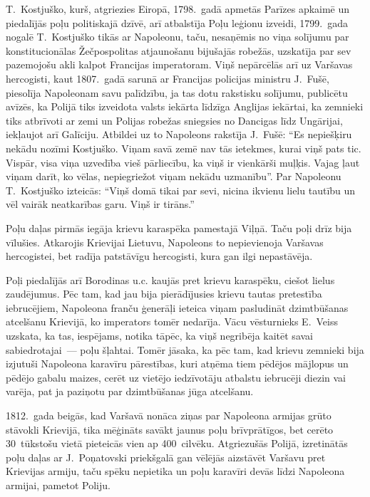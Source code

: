 \documentclass[twoside,a5paper,12pt,fleqn,openany]{extbook}
\begin{document}
T.~Kostjuško, kurš, atgriezies Eiropā, 1798.~gadā apmetās Parīzes apkaimē un piedalījās poļu politiskajā dzīvē, arī atbalstīja Poļu leģionu izveidi, 1799.~gada nogalē T.~Kostjuško tikās ar Napoleonu, taču, nesaņēmis no viņa solījumu par konstitucionālas Žečpospolitas atjaunošanu bijušajās robežās, uzskatīja par sev pazemojošu akli kalpot Francijas imperatoram. Viņš nepārcēlās arī uz Varšavas hercogisti, kaut 1807.~gadā sarunā ar Francijas policijas ministru J.~Fušē, piesolīja Napoleonam savu palīdzību, ja tas dotu rakstisku solījumu, publicētu avīzēs, ka Polijā tiks izveidota valsts iekārta līdzīga Anglijas iekārtai, ka zemnieki tiks atbrīvoti ar zemi un Polijas robežas sniegsies no Dancigas līdz Ungārijai, iekļaujot arī Galīciju. Atbildei uz to Napoleons rakstīja J.~Fušē: ``Es nepiešķiru nekādu nozīmi Kostjuško. Viņam savā zemē nav tās ietekmes, kurai viņš pats tic. Vispār, visa viņa uzvedība vieš pārliecību, ka viņš ir vienkārši muļķis. Vajag ļaut viņam darīt, ko vēlas, nepiegriežot viņam nekādu uzmanību''. Par Napoleonu T.~Kostjuško izteicās: ``Viņš domā tikai par sevi, nicina ikvienu lielu tautību un vēl vairāk neatkarības garu. Viņš ir tirāns.''

Poļu daļas pirmās iegāja krievu karaspēka pamestajā Viļņā. Taču poļi drīz bija vīlušies. Atkarojis Krievijai Lietuvu, Napoleons to nepievienoja Varšavas hercogistei, bet radīja patstāvīgu hercogisti, kura gan ilgi nepastāvēja.

Poļi piedalījās arī Borodinas u.c. kaujās pret krievu karaspēku, ciešot lielus zaudējumus. Pēc tam, kad jau bija pierādījusies krievu tautas pretestība iebrucējiem, Napoleona franču ģenerāļi ieteica viņam pasludināt dzimtbūšanas atcelšanu Krievijā, ko imperators tomēr nedarīja. Vācu vēsturnieks E.~Veiss uzskata, ka tas, iespējams, notika tāpēc, ka viņš negribēja kaitēt savai sabiedrotajai~--- poļu šļahtai. Tomēr jāsaka, ka pēc tam, kad krievu zemnieki bija izjutuši Napoleona karavīru pārestības, kuri atņēma tiem pēdējos mājlopus un pēdējo gabalu maizes, cerēt uz vietējo iedzīvotāju atbalstu iebrucēji diezin vai varēja, pat ja paziņotu par dzimtbūšanas jūga atcelšanu.

1812.~gada beigās, kad Varšavā nonāca ziņas par Napoleona armijas grūto stāvokli Krievijā, tika mēģināts savākt jaunus poļu brīvprātīgos, bet cerēto 30~tūkstošu vietā pieteicās vien ap 400~cilvēku. Atgriezušās Polijā, izretinātās poļu daļas ar J.~Poņatovski priekšgalā gan vēlējās aizstāvēt Varšavu pret Krievijas armiju, taču spēku nepietika un poļu karavīri devās līdzi Napoleona armijai, pametot Poliju.
\end{document}
